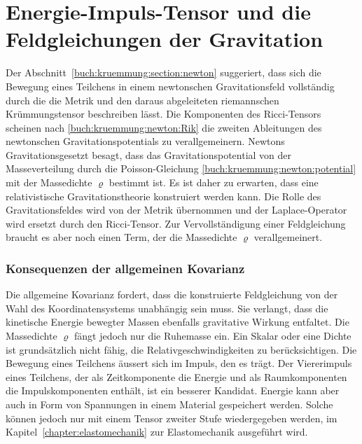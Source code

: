 %
%
\section{Energie-Impuls-Tensor und die Feldgleichungen der Gravitation
\label{buch:kruemmung:section:gravitation}}

Der Abschnitt~\ref{buch:kruemmung:section:newton} suggeriert, dass sich
die Bewegung eines Teilchens in einem newtonschen Gravitationsfeld
vollständig durch die die Metrik und den daraus abgeleiteten riemannschen
Krümmungstensor beschreiben lässt.
Die Komponenten des Ricci-Tensors scheinen nach
\eqref{buch:kruemmung:newton:Rik} die zweiten Ableitungen des
newtonschen Gravitationspotentials zu verallgemeinern.
Newtons Gravitationsgesetzt besagt, dass das Gravitationspotential von
der Masseverteilung durch die Poisson-Gleichung
\eqref{buch:kruemmung:newton:potential}
mit der Massedichte $\varrho$ bestimmt ist.
Es ist daher zu erwarten, dass eine relativistische Gravitationstheorie
konstruiert werden kann.
Die Rolle des Gravitationsfeldes wird von der Metrik übernommen und der
Laplace-Operator wird ersetzt durch den Ricci-Tensor.
Zur Vervollständigung einer Feldgleichung braucht es aber noch einen
Term, der die Massedichte $\varrho$ verallgemeinert.

%
%
\subsubsection{Konsequenzen der allgemeinen Kovarianz}
Die allgemeine Kovarianz fordert, dass die konstruierte Feldgleichung
von der Wahl des Koordinatensystems unabhängig sein muss.
Sie verlangt, dass die kinetische Energie bewegter Massen ebenfalls
gravitative Wirkung entfaltet.
Die Massedichte $\varrho$ fängt jedoch nur die Ruhemasse ein.
Ein Skalar oder eine Dichte ist grundsätzlich nicht fähig, die
Relativgeschwindigkeiten zu berücksichtigen.
Die Bewegung eines Teilchens äussert sich im Impuls, den es trägt.
Der Viererimpuls eines Teilchens, der als Zeitkomponente die Energie
und als Raumkomponenten die Impulskomponenten enthält, ist ein
besserer Kandidat.
Energie kann aber auch in Form von Spannungen in einem Material 
gespeichert werden.
Solche können jedoch nur mit einem Tensor zweiter Stufe wiedergegeben
werden, im Kapitel~\ref{chapter:elastomechanik} zur Elastomechanik
ausgeführt wird.

